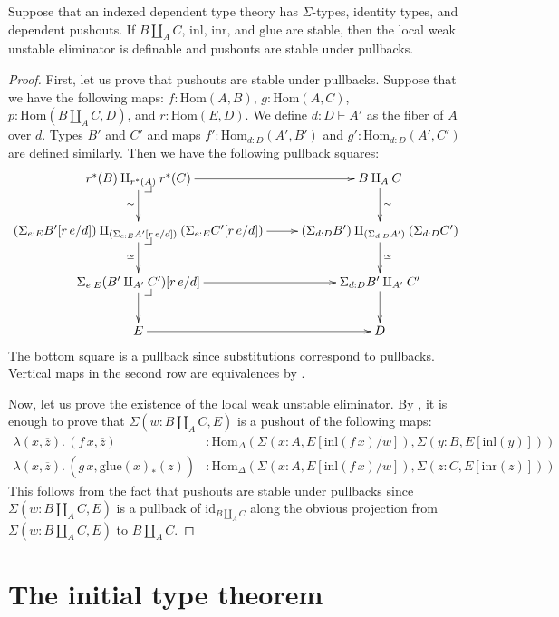 \documentclass[reqno]{amsart}
\makeatletter
\theoremstyle{definition}
\theoremstyle{remark}
\newcommand{\ob}{}
\newcommand{\fs}[1]{\mathrm{#1}}
\newcommand{\Hom}{\fs{Hom}}
\newcommand{\id}{\fs{id}}
\numberwithin{figure}{section}
\newcommand{\pb}[1][dr]{\save*!/#1-1.2pc/#1:(-1,1)@^{|-}\restore}
\makeatother
\begin{document}
\begin{prop}
Suppose that an indexed dependent type theory has $\Sigma$-types, identity types, and dependent pushouts.
If $B \amalg_A C$, $\fs{inl}$, $\fs{inr}$, and $\fs{glue}$ are stable, then the local weak unstable eliminator is definable and pushouts are stable under pullbacks.
\end{prop}
\begin{proof}
First, let us prove that pushouts are stable under pullbacks.
Suppose that we have the following maps: $f : \Hom(A,B)$, $g : \Hom(A,C)$, $p : \Hom(B \amalg_A C, D)$, and $r : \Hom(E,D)$.
We define $d : D \vdash A' \ob$ as the fiber of $A$ over $d$.
Types $B'$ and $C'$ and maps $f' : \Hom_{d : D}(A',B')$ and $g' : \Hom_{d : D}(A',C')$ are defined similarly.
Then we have the following pullback squares:
\[ \xymatrix{ r^*(B) \amalg_{r^*(A)} r^*(C) \ar[r] \ar[d]_\simeq \pb & B \amalg_A C \ar[d]^\simeq \\
              (\Sigma_{e : E} B'[r\,e/d]) \amalg_{(\Sigma_{e : E} A'[r\,e/d])} (\Sigma_{e : E} C'[r\,e/d]) \ar[r] \ar[d]_\simeq \pb & (\Sigma_{d : D} B') \amalg_{(\Sigma_{d : D} A')} (\Sigma_{d : D} C') \ar[d]^\simeq \\
              \Sigma_{e : E} (B' \amalg_{A'} C')[r\,e/d] \ar[r] \ar[d] \pb & \Sigma_{d : D} B' \amalg_{A'} C' \ar[d] \\
              E \ar[r] & D
            } \]
The bottom square is a pullback since substitutions correspond to pullbacks.
Vertical maps in the second row are equivalences by .

Now, let us prove the existence of the local weak unstable eliminator.
By , it is enough to prove that $\Sigma(w : B \amalg_A C, E)$ is a pushout of the following maps:
\begin{align*}
\lambda (x, \overline{z}).\,(f\,x, \overline{z}) & : \Hom_\Delta(\Sigma(x : A, E[\fs{inl}(f\,x)/w]), \Sigma(y : B, E[\fs{inl}(y)])) \\
\lambda (x, \overline{z}).\,(g\,x, \overline{\fs{glue}(x)_*(z)}) & : \Hom_\Delta(\Sigma(x : A, E[\fs{inl}(f\,x)/w]), \Sigma(z : C, E[\fs{inr}(z)]))
\end{align*}
This follows from the fact that pushouts are stable under pullbacks since $\Sigma(w : B \amalg_A C, E)$ is a pullback of $\id_{B \amalg_A C}$ along the obvious projection from $\Sigma(w : B \amalg_A C, E)$ to $B \amalg_A C$.
\end{proof}

\section{The initial type theorem}
\label{sec:initial}
\end{document}
